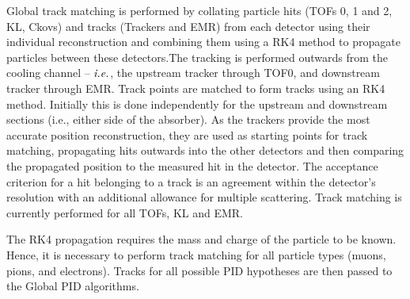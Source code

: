 \documentclass{JINST}
\begin{document}
Global track matching is performed by collating particle hits (TOFs 0, 1 and 2, KL, Ckovs) and tracks (Trackers and EMR) from each detector using their individual reconstruction and combining them using a RK4 method to propagate particles between these detectors.The tracking is performed outwards from the cooling channel -- $\emph{i.e.}$, the upstream tracker through TOF0, and downstream tracker through EMR.
%
Track points are matched to form tracks using an RK4 method. Initially this is done independently for the upstream and downstream sections (i.e., either side of the absorber). As the trackers provide the most accurate position reconstruction, they are used as starting points for track matching, propagating hits outwards into the other detectors and then comparing the propagated position to the measured hit in the detector. The acceptance criterion for a hit belonging to a track is an agreement within the detector's resolution with an additional allowance for multiple scattering.  Track matching is currently performed for all TOFs, KL and EMR. 

The RK4 propagation requires the mass and charge of the particle to be known. Hence, it is necessary to perform track matching for all particle types (muons, pions, and electrons). Tracks for all possible PID hypotheses are then passed to the Global PID algorithms. 

%

\end{document}
